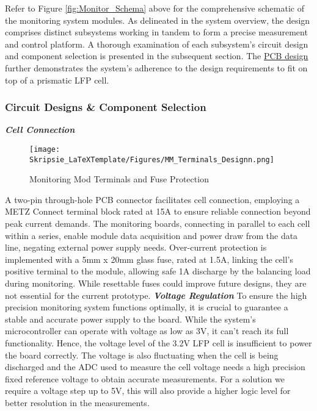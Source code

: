 \noindent
Refer to Figure \ref{fig:Monitor_Schema} above for the comprehensive schematic of the monitoring system modules. As delineated in the system overview, the design comprises distinct subsystems working in tandem to form a precise measurement and control platform. A thorough examination of each subsystem's circuit design and component selection is presented in the subsequent section. The \hyperref[subsec:mmmm3]{PCB design} further demonstrates the system's adherence to the design requirements to fit on top of a prismatic LFP cell.
\subsubsection{Circuit Designs \& Component Selection}\label{subsec:mmmm2}
\textbf{\emph{Cell Connection}}\label{subsubsec:MM_terminals_dsgn}

\begin{figure}[h!]
\centering
\texttt{[image: Skripsie\_LaTeXTemplate/Figures/MM\_Terminals\_Designn.png]}
\caption{Monitoring Mod Terminals and Fuse Protection \cite{inlineFuse}}
\label{fig:MM_D9}
\end{figure}
\noindent
A two-pin through-hole PCB connector facilitates cell connection, employing a METZ Connect terminal block rated at 15A to ensure reliable connection beyond peak current demands. The monitoring boards, connecting in parallel to each cell within a series, enable module data acquisition and power draw from the data line, negating external power supply needs. Over-current protection is implemented with a 5mm x 20mm glass fuse, rated at 1.5A, linking the cell's positive terminal to the module, allowing safe 1A discharge by the balancing load during monitoring. While resettable fuses could improve future designs, they are not essential for the current prototype.\newline\newline
\noindent
\textbf{\emph{Voltage Regulation}}\label{subsubsec:PWR_supply_dsgn}\newline
\noindent
To ensure the high precision monitoring system functions optimally, it is crucial to guarantee a stable and accurate power supply to the board. While the system’s microcontroller can operate with voltage as low as 3V, it can’t reach its full functionality. Hence, the voltage level of the 3.2V LFP cell is insufficient to power the board correctly. The voltage is also fluctuating when the cell is being discharged and the ADC used to measure the cell voltage needs a high precision fixed reference voltage to obtain accurate measurements. For a solution we require a voltage step up to 5V, this will also provide a higher logic level for better resolution in the measurements.  

